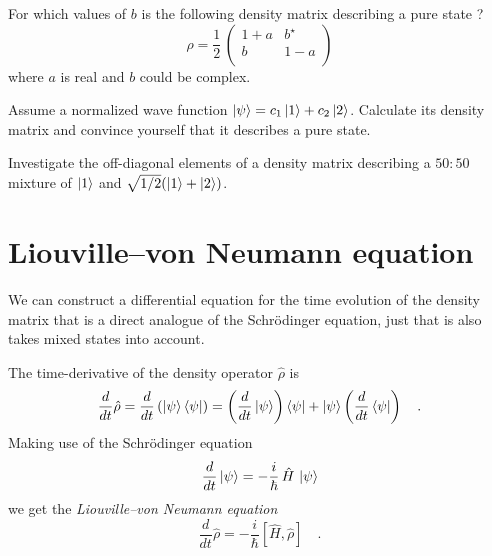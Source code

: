 \begin{questions}

\item For which values of $b$ is the following density matrix describing a pure state ?
\begin{equation*}
 \rho = \frac{1}{2} \, \begin{pmatrix}
1+a & b^\star \\ b & 1-a \\
 \end{pmatrix} 
\end{equation*}
where $a$ is real and $b$ could be complex.

\item Assume a normalized wave function $\ket{\psi} = c_1 \ket{1} + c_2 \ket{2}$. Calculate its density matrix and convince yourself that it describes a pure state.

\item Investigate the off-diagonal elements of a density matrix describing a $50:50$ mixture of $\ket{1}$ and $\sqrt{1/2}(\ket{1} + \ket{2})$. \label{q:rabi_coherence_mixture}


\end{questions}




\section{Liouville--von Neumann equation}

We can construct a differential equation for the time evolution of the density matrix that is a direct analogue of the Schrödinger equation, just that is also takes mixed states into account.

The time-derivative of the density operator $\hat{\rho}$ is
\begin{equation}
 \frac{d}{dt} \hat{\rho}= \frac{d}{dt} \left( \ket{\psi} \bra{\psi} \right) 
 =  \left( \frac{d}{dt}  \ket{\psi} \right) \bra{\psi} 
 + \ket{\psi} \left( \frac{d}{dt}  \bra{\psi} \right)  \quad .
\end{equation}
Making use of the Schrödinger equation
\begin{equation}
 \frac{d}{dt} \ket{\psi} = - \frac{i}{\hbar} \, \hat{H} \, \ket{\psi}
\end{equation}
we get the \emph{Liouville--von Neumann equation}
\begin{equation}
 \frac{d}{dt} \hat{\rho} = - \frac{i}{\hbar} 
 \left[ \hat{H} ,\hat{\rho} \right]  \quad .
\end{equation}

